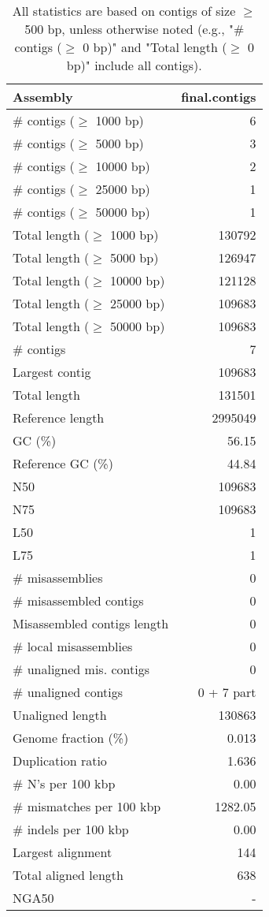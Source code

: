 \documentclass[12pt,a4paper]{article}
\begin{document}
\begin{table}[ht]
\begin{center}
\caption{All statistics are based on contigs of size $\geq$ 500 bp, unless otherwise noted (e.g., "\# contigs ($\geq$ 0 bp)" and "Total length ($\geq$ 0 bp)" include all contigs).}
\begin{tabular}{|l*{1}{|r}|}
\hline
Assembly & final.contigs \\ \hline
\# contigs ($\geq$ 1000 bp) & 6 \\ \hline
\# contigs ($\geq$ 5000 bp) & 3 \\ \hline
\# contigs ($\geq$ 10000 bp) & 2 \\ \hline
\# contigs ($\geq$ 25000 bp) & 1 \\ \hline
\# contigs ($\geq$ 50000 bp) & 1 \\ \hline
Total length ($\geq$ 1000 bp) & 130792 \\ \hline
Total length ($\geq$ 5000 bp) & 126947 \\ \hline
Total length ($\geq$ 10000 bp) & 121128 \\ \hline
Total length ($\geq$ 25000 bp) & 109683 \\ \hline
Total length ($\geq$ 50000 bp) & 109683 \\ \hline
\# contigs & 7 \\ \hline
Largest contig & 109683 \\ \hline
Total length & 131501 \\ \hline
Reference length & 2995049 \\ \hline
GC (\%) & 56.15 \\ \hline
Reference GC (\%) & 44.84 \\ \hline
N50 & 109683 \\ \hline
N75 & 109683 \\ \hline
L50 & 1 \\ \hline
L75 & 1 \\ \hline
\# misassemblies & 0 \\ \hline
\# misassembled contigs & 0 \\ \hline
Misassembled contigs length & 0 \\ \hline
\# local misassemblies & 0 \\ \hline
\# unaligned mis. contigs & 0 \\ \hline
\# unaligned contigs & 0 + 7 part \\ \hline
Unaligned length & 130863 \\ \hline
Genome fraction (\%) & 0.013 \\ \hline
Duplication ratio & 1.636 \\ \hline
\# N's per 100 kbp & 0.00 \\ \hline
\# mismatches per 100 kbp & 1282.05 \\ \hline
\# indels per 100 kbp & 0.00 \\ \hline
Largest alignment & 144 \\ \hline
Total aligned length & 638 \\ \hline
NGA50 & - \\ \hline
\end{tabular}
\end{center}
\end{table}
\end{document}
